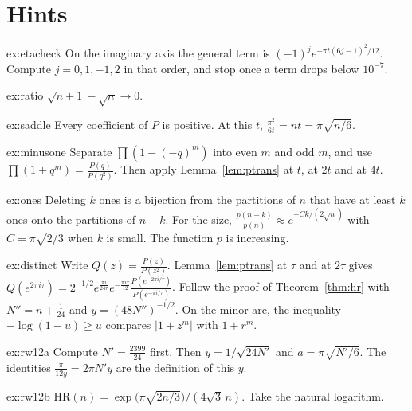\section{Hints}

\begin{hint}{ex:etacheck}
On the imaginary axis the general term is $(-1)^je^{-\pi t(6j-1)^2/12}$. Compute $j=0,1,-1,2$ in that order, and stop once a term drops below $10^{-7}$.
\end{hint}

\begin{hint}{ex:ratio}
$\sqrt{n+1}-\sqrt n\to0$.
\end{hint}

\begin{hint}{ex:saddle}
Every coefficient of $P$ is positive. At this $t$, $\frac{\pi^2}{6t}=nt=\pi\sqrt{n/6}$.
\end{hint}

\begin{hint}{ex:minusone}
Separate $\prod(1-(-q)^m)$ into even $m$ and odd $m$, and use $\prod(1+q^m)=\frac{P(q)}{P(q^2)}$. Then apply Lemma~\ref{lem:ptrans} at $t$, at $2t$ and at $4t$.
\end{hint}

\begin{hint}{ex:ones}
Deleting $k$ ones is a bijection from the partitions of $n$ that have at least $k$ ones onto the partitions of $n-k$. For the size, $\frac{p(n-k)}{p(n)}\approx e^{-Ck/(2\sqrt n)}$ with $C=\pi\sqrt{2/3}$ when $k$ is small. The function $p$ is increasing.
\end{hint}

\begin{hint}{ex:distinct}
Write $Q(z)=\frac{P(z)}{P(z^2)}$. Lemma~\ref{lem:ptrans} at $\tau$ and at $2\tau$ gives $Q(e^{2\pi i\tau})=2^{-1/2}e^{\frac{\pi i}{24\tau}}e^{-\frac{\pi i\tau}{12}}\frac{P(e^{-2\pi i/\tau})}{P(e^{-\pi i/\tau})}$. Follow the proof of Theorem~\ref{thm:hr} with $N''=n+\frac1{24}$ and $y=(48N'')^{-1/2}$. On the minor arc, the inequality $-\log(1-u)\ge u$ compares $|1+z^m|$ with $1+r^m$.
\end{hint}


\begin{hint}{ex:rw12a}
Compute $N'=\frac{2399}{24}$ first. Then $y=1/\sqrt{24N'}$ and $a=\pi\sqrt{N'/6}$. The identities $\frac\pi{12y}=2\pi N'y$ are the definition of this $y$.
\end{hint}

\begin{hint}{ex:rw12b}
$\mathrm{HR}(n)=\exp\bigl(\pi\sqrt{2n/3}\bigr)/(4\sqrt3\,n)$. Take the natural logarithm.
\end{hint}

